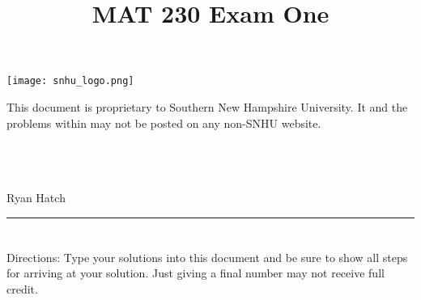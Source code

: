 \documentclass{amsart}
\theoremstyle{definition}
\theoremstyle{Exercise}
\theoremstyle{remark}
\theoremstyle{rule}
\numberwithin{equation}{section}
\begin{document}
\title{\sf MAT 230 Exam One}%


\begin{center}
\texttt{[image: snhu\_logo.png]}
\end{center}

\maketitle
This document is proprietary to Southern New Hampshire University. It and the problems within may not be posted on any non-SNHU website.\\\\\\\\
\begin{center}
Ryan Hatch
\end{center}

\begin{center}
\rule{\textwidth}{0.4pt}
\end{center}
\newpage
\section*{}
\section*{}
Directions: Type your solutions into this document and be sure to show all steps for arriving at your solution. Just giving a final number may not receive full credit.
\\
\end{document}
